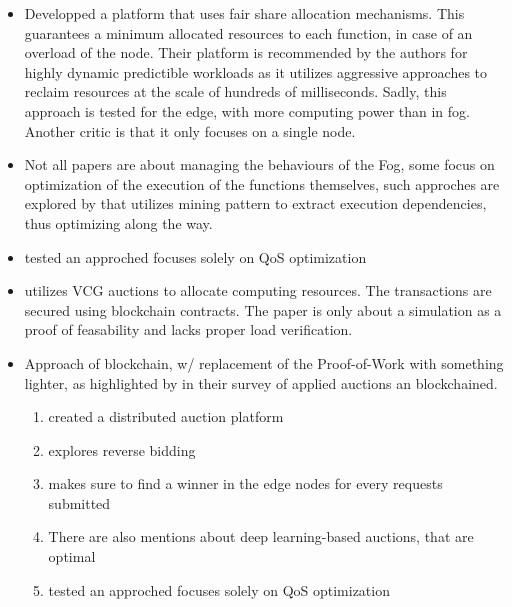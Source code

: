 \documentclass[11pt]{sdm}
\begin{document}
\begin{itemize}
    \item {} Developped a platform that uses fair share allocation mechanisms. This guarantees a minimum allocated resources to each function, in case of an overload of the node. Their platform is recommended by the authors for highly dynamic predictible workloads as it utilizes aggressive approaches to reclaim resources at the scale of hundreds of milliseconds. Sadly, this approach is tested for the edge, with more computing power than in fog. Another critic is that it only focuses on a single node.
    \item Not all papers are about managing the behaviours of the Fog, some focus on optimization of the execution of the functions themselves, such approches are explored by \citet{shen_defuse_2021} that utilizes mining pattern to extract execution dependencies, thus optimizing along the way.
\end{itemize}
\begin{itemize}
    \item {} tested an approched focuses solely on QoS optimization
\end{itemize}

\begin{itemize}
    \item \citet{lee_trustful_2020} utilizes VCG auctions to allocate computing resources. The transactions are secured using blockchain contracts. The paper is only about a simulation as a proof of feasability and lacks proper load verification.
    \item {Approach of blockchain, w/ replacement of the Proof-of-Work with something lighter, as highlighted by \citet{xie_when_2021} in their survey of applied auctions an blockchained. \begin{enumerate}
        \item \citet{zavodovski_decloud_2019} created a distributed auction platform
        \item \citet{debe_blockchain-based_2020} explores reverse bidding
        \item \citet{yu_building_2019} makes sure to find a winner in the edge nodes for every requests submitted
        \item There are also mentions about deep learning-based auctions, that are optimal
        \item {} tested an approched focuses solely on QoS optimization
    \end{enumerate} }
\end{itemize}
\end{document}
